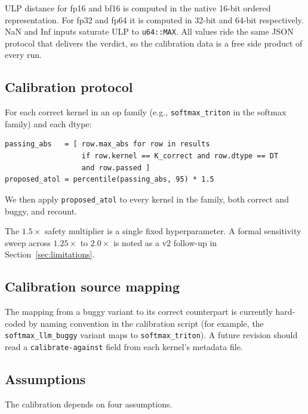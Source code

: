 \documentclass[runningheads]{llncs}
\begin{document}
ULP distance for fp16 and bf16 is computed in the native 16-bit ordered
representation. For fp32 and fp64 it is computed in 32-bit and 64-bit
respectively. NaN and Inf inputs saturate ULP to \texttt{u64::MAX}. All
values ride the same JSON protocol that delivers the verdict, so the
calibration data is a free side product of every run.

\subsection{Calibration protocol}
\label{sec:method:cal}

For each correct kernel in an op family (e.g., \texttt{softmax\_triton}
in the softmax family) and each dtype:

\begin{verbatim}
passing_abs   = [ row.max_abs for row in results
                  if row.kernel == K_correct and row.dtype == DT
                  and row.passed ]
proposed_atol = percentile(passing_abs, 95) * 1.5
\end{verbatim}

We then apply \texttt{proposed\_atol} to every kernel in the family,
both correct and buggy, and recount.

The $1.5\times$ safety multiplier is a single fixed hyperparameter.
A formal sensitivity sweep across $1.25\times$ to $2.0\times$ is
noted as a v2 follow-up in Section~\ref{sec:limitations}.

\subsection{Calibration source mapping}
\label{sec:method:src}

The mapping from a buggy variant to its correct counterpart is
currently hard-coded by naming convention in the calibration script
(for example, the \texttt{softmax\_llm\_buggy} variant maps to
\texttt{softmax\_triton}). A future revision should read a
\texttt{calibrate-against} field from each kernel's metadata file.

\subsection{Assumptions}
\label{sec:method:assumptions}

The calibration depends on four assumptions.
\end{document}
